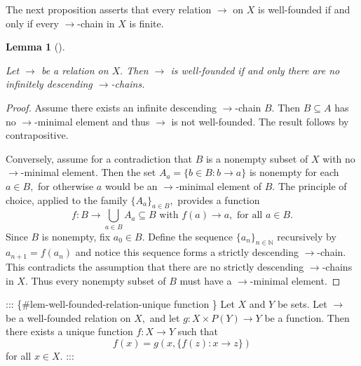 \documentclass[
  letterpaper,
  10pt,
  reqno,
  twopage,
  openany]{book}
\theoremstyle{plain}
\newtheorem{lemma}{Lemma}[chapter]
\theoremstyle{definition}
\theoremstyle{definition}
\theoremstyle{definition}
\theoremstyle{plain}
\theoremstyle{plain}
\theoremstyle{remark}
\begin{document}
The next proposition asserts that every relation \(\longrightarrow\) on
\(X\) is well-founded if and only if every \(\longrightarrow\)-chain in
\(X\) is finite.

\leavevmode{}%
\begin{lemma}[]\label{lem-infinitely-descending-chains}

Let \(\longrightarrow\) be a relation on \(X.\) Then \(\longrightarrow\)
is well-founded if and only there are no infinitely descending
\(\longrightarrow\)-chains.

\end{lemma}

\begin{proof}

Assume there exists an infinite descending \(\longrightarrow\)-chain
\(B.\) Then \(B\subseteq A\) has no \(\longrightarrow\)-minimal element
and thus \(\longrightarrow\) is not well-founded. The result follows by
contrapositive.

Conversely, assume for a contradiction that \(B\) is a nonempty subset
of \(X\) with no \(\longrightarrow\)-minimal element. Then the set
\(A_a=\{b\in B : b \longrightarrow a\}\) is nonempty for each
\(a\in B,\) for otherwise \(a\) would be an \(\longrightarrow\)-minimal
element of \(B.\) The principle of choice, applied to the family
\(\{A_a\}_{a\in B},\) provides a function \[
f: B\longrightarrow \bigcup_{a\in B} A_a\subseteq B \text{ with } f(a) \longrightarrow a,  \text{ for all } a\in B.
\] Since \(B\) is nonempty, fix \(a_0\in B.\) Define the sequence
\(\{a_n\}_{n\in \mathbb{N}}\) recursively by \(a_{n+1}=f(a_n)\) and
notice this sequence forms a strictly descending
\(\longrightarrow\)-chain. This contradicts the assumption that there
are no strictly descending \(\longrightarrow\)-chains in \(X.\) Thus
every nonempty subset of \(B\) must have a \(\longrightarrow\)-minimal
element.

\end{proof}

::: \{\#lem-well-founded-relation-unique function \} Let \(X\) and \(Y\)
be sets. Let \(\longrightarrow\) be a well-founded relation on \(X,\)
and let \(g:X\times P(Y)\to Y\) be a function. Then there exists a
unique function \(f:X\to Y\) such that \[
f(x)=g(x,\{f(z): x\longrightarrow z\})
\] for all \(x\in X.\) :::
\end{document}
